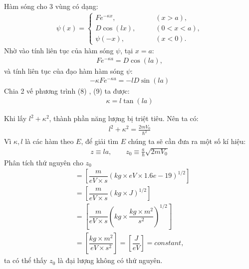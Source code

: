 \documentclass{article}
\begin{document}
	Hàm sóng cho 3 vùng có dạng:
	\begin{align}
		\psi(x) =
		\begin{cases}
			F e^{-\kappa x} ,&\quad \quad (x>a),\\
			D \cos (lx) , &\quad \quad (0<x<a),\\
			\psi(-x), &\quad \quad (x<0).
		\end{cases}
	\end{align}
	Nhờ vào tính liên tục của hàm sóng $\psi$, tại $x = a$:
	\begin{align}
		F e^{-\kappa a} = D \cos (la),
	\end{align}
	và tính liên tục của đạo hàm hàm sóng $\psi$:
	\begin{align}
		-\kappa F e^{-\kappa a} = -l D \sin (la)
	\end{align}
	Chia 2 vế phương trình (8) , (9) ta được:
	\begin{align}
		\kappa = l \tan (la)
	\end{align}
	
	Khi lấy $l^2 + \kappa ^2$, thành phần năng lượng bị triệt tiêu. Nên ta có:
	\begin{align}
		l^2 + \kappa^2 = \frac{2mV_0}{\hbar^2}
	\end{align}
	Vì $\kappa ,l$ là các hàm theo $E$, để giải tìm $E$ chúng ta sẽ cần đưa ra một số kí hiệu:
	\begin{align}
		z \equiv la, \quad \quad z_0 \equiv \frac{a}{\hbar} \sqrt{2mV_0} 
	\end{align}
	Phân tích thứ nguyên cho $z_0$
	\begin{align}
		[z_0] &= \left[ \dfrac{m}{eV\times s} (kg \times eV \times 1.6e-19)^{1/2}  \right] \nonumber \\
		& = \left[ \dfrac{m}{eV\times s} (kg \times J)^{1/2}  \right] \nonumber \\
		& = \left[ \dfrac{m}{eV\times s} (kg \times \dfrac{kg \times m^2}{s^2})^{1/2}  \right] \nonumber\\
		& = \left[ \dfrac{kg\times m^2}{eV\times s^2}\right]  = \left[\dfrac{J}{eV}\right] = constant,
	\end{align}
	ta có thể thấy $z_0$ là đại lượng không có thứ nguyên.
	
\end{document}
